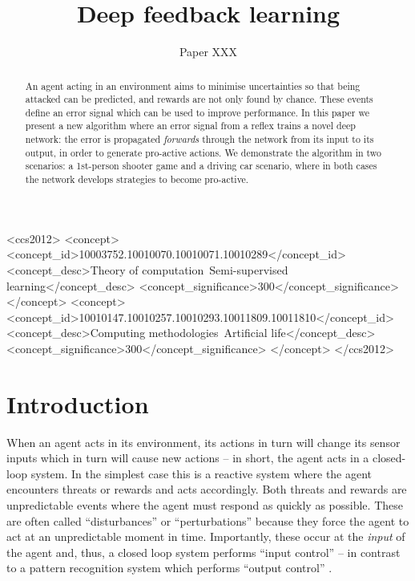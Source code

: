 \documentclass{aamas2017}
\title{Deep feedback learning}
\author{
%
\alignauthor
Paper XXX
}
\begin{document}
\maketitle

\begin{abstract}
 An agent acting in an environment aims to minimise uncertainties so
 that being attacked can be predicted, and rewards are not only found
 by chance. These events define an error signal which can be used to
 improve performance. In this paper we present a new algorithm where
 an error signal from a reflex trains a novel deep network: the error
 is propagated \textsl{forwards} through the network from its input to
 its output, in order to generate pro-active actions. We demonstrate
 the algorithm in two scenarios: a 1st-person shooter game and a
 driving car scenario, where in both cases the network develops
 strategies to become pro-active.
\end{abstract}



 \begin{CCSXML}
<ccs2012>
<concept>
<concept_id>10003752.10010070.10010071.10010289</concept_id>
<concept_desc>Theory of computation~Semi-supervised learning</concept_desc>
<concept_significance>300</concept_significance>
</concept>
<concept>
<concept_id>10010147.10010257.10010293.10011809.10011810</concept_id>
<concept_desc>Computing methodologies~Artificial life</concept_desc>
<concept_significance>300</concept_significance>
</concept>
</ccs2012>
\end{CCSXML}



\printccsdesc





\section{Introduction}
When an agent acts in its environment, its actions in turn will change
its sensor inputs which in turn will cause new actions -- in short,
the agent acts in a closed-loop system. In the simplest case this is a
reactive system where the agent encounters threats or rewards and acts
accordingly. Both threats and rewards are unpredictable events where
the agent must respond as quickly as possible. These are often called
``disturbances'' or ``perturbations'' because they force the agent to
act at an unpredictable moment in time. Importantly, these occur at
the \textsl{input} of the agent and, thus, a closed loop system
performs ``input control'' -- in contrast to a pattern recognition
system which performs ``output control'' \cite{Phillips2000}.
\end{document}

